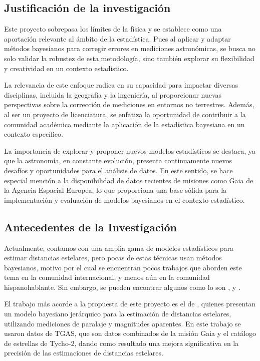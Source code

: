 \documentclass[stu, 12pt, letterpaper, donotrepeattitle, floatsintext, natbib]{apa7_ula}
\begin{document}
\subsection{Justificación de la investigación}

Este proyecto sobrepasa los límites de la física y se establece como una
aportación relevante al ámbito de la estadística. Pues al aplicar y adaptar
métodos bayesianos para corregir errores en mediciones astronómicas,
se busca no solo validar la robustez de esta metodología, sino también
explorar su flexibilidad y creatividad en un contexto estadístico.

La relevancia de este enfoque radica en su capacidad para impactar diversas
disciplinas, incluida la geografía y la ingeniería, al proporcionar nuevas
perspectivas sobre la corrección de mediciones en entornos no terrestres.
Además, al ser un proyecto de licenciatura, se enfatiza la oportunidad de
contribuir a la comunidad académica mediante la aplicación de la estadística
bayesiana en un contexto específico.

La importancia de explorar y proponer nuevos modelos estadísticos se destaca,
ya que la astronomía, en constante evolución, presenta continuamente nuevos
desafíos y oportunidades para el análisis de datos. En este sentido, se hace
especial mención a la disponibilidad de datos recientes de misiones como Gaia
de la Agencia Espacial Europea, lo que proporciona una base sólida para la
implementación y evaluación de modelos bayesianos en el contexto estadístico.

\subsection{Antecedentes de la Investigación}

Actualmente, contamos con una amplia gama de modelos estadísticos para
estimar distancias estelares, pero pocas de estas técnicas usan métodos bayesianos,
motivo por el cual se encuentran pocos trabajos que aborden este tema en
la comunidad internacional, y menos aún en la comunidad hispanohablante. Sin embargo,
se pueden encontrar algunos como lo son
\citet{Leistedt_2017}, \citet{Anderson_2017} y \citet{Zhang_2023}.

El trabajo más acorde a la propuesta de este proyecto es el de \citet{Leistedt_2017},
quienes presentan un modelo bayesiano jerárquico para la estimación de distancias
estelares, utilizando mediciones de paralaje y magnitudes aparentes. En este trabajo
se usaron datos de TGAS, que son datos combinados de la misión Gaia y el catálogo de
estrellas de Tycho-2, dando como resultado una mejora significativa en la precisión
de las estimaciones de distancias estelares.
\end{document}
